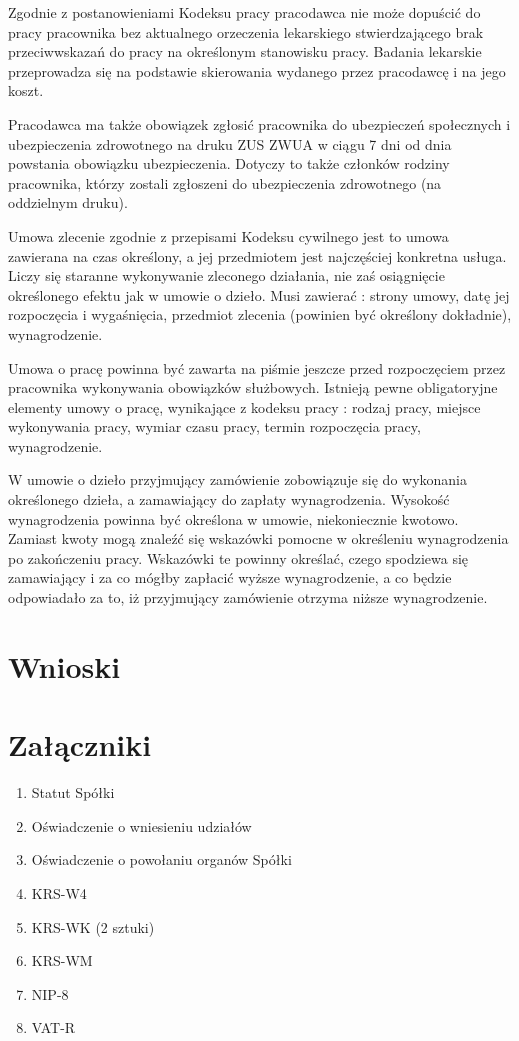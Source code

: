 \documentclass[11pt]{article}
\begin{document}
	Zgodnie z postanowieniami Kodeksu pracy pracodawca nie może dopuścić do pracy pracownika bez aktualnego orzeczenia lekarskiego stwierdzającego brak przeciwwskazań do pracy na określonym stanowisku pracy. Badania lekarskie przeprowadza się na podstawie skierowania wydanego przez pracodawcę i na jego koszt.
	
	
    Pracodawca ma także obowiązek zgłosić pracownika do ubezpieczeń społecznych i ubezpieczenia zdrowotnego na druku ZUS ZWUA w ciągu 7 dni od dnia powstania obowiązku ubezpieczenia. Dotyczy to także członków rodziny pracownika, którzy zostali zgłoszeni do ubezpieczenia zdrowotnego (na oddzielnym druku).
    
    Umowa zlecenie zgodnie z przepisami Kodeksu cywilnego jest to umowa zawierana na czas określony, a jej przedmiotem jest najczęściej konkretna usługa. Liczy się staranne wykonywanie zleconego działania, nie zaś osiągnięcie określonego efektu jak w umowie o dzieło. Musi zawierać : strony umowy, datę jej rozpoczęcia i wygaśnięcia, przedmiot zlecenia (powinien być określony dokładnie), wynagrodzenie.
    
   Umowa o pracę powinna być zawarta na piśmie jeszcze przed rozpoczęciem przez pracownika wykonywania obowiązków służbowych. Istnieją pewne obligatoryjne elementy umowy o pracę, wynikające z kodeksu pracy : rodzaj pracy, miejsce wykonywania pracy, wymiar czasu pracy, termin rozpoczęcia pracy, wynagrodzenie.
    
  W umowie o dzieło przyjmujący zamówienie zobowiązuje się do wykonania określonego dzieła, a zamawiający do zapłaty wynagrodzenia. Wysokość wynagrodzenia powinna być określona w umowie, niekoniecznie kwotowo. Zamiast kwoty mogą znaleźć się wskazówki pomocne w określeniu wynagrodzenia po zakończeniu pracy. Wskazówki te powinny określać, czego spodziewa się zamawiający i za co mógłby zapłacić wyższe wynagrodzenie, a co będzie odpowiadało za to, iż przyjmujący zamówienie otrzyma niższe wynagrodzenie.
  
	\section{Wnioski}
    
    \section{Załączniki}
    \begin{enumerate}
    	\item Statut Spółki
    	\item Oświadczenie o wniesieniu udziałów
    	\item Oświadczenie o powołaniu organów Spółki
    	\item KRS-W4
    	\item KRS-WK (2 sztuki)
    	\item KRS-WM
    	\item NIP-8
    	\item VAT-R
    \end{enumerate}
\end{document}
